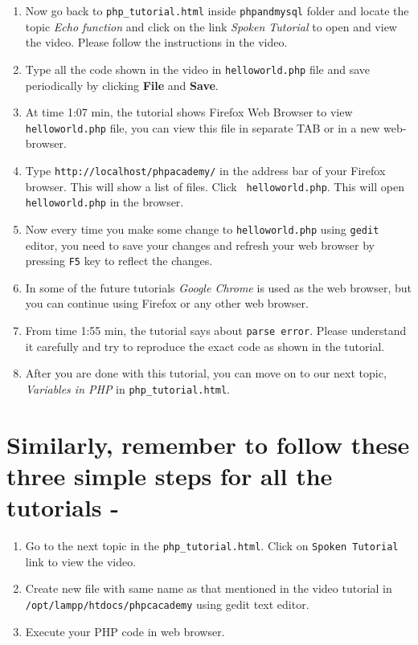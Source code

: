 \documentclass[11pt]{article}
\newenvironment{enumcpt}{\begin{enumerate} \topsep 0pt \partopsep 0pt 
    \parsep 0pt
    \itemsep 0pt \leftmargin -1in \rightmargin 0pt
}{\end{enumerate}}
\begin{document}
\begin{multicols}{2}
\begin{enumcpt}
\begin{enumcpt}
    \end{enumcpt}

  \item Now go back to {\tt php\_tutorial.html} inside {\tt phpandmysql}
    folder and locate the topic \emph{Echo function} and click on the
    link \emph{Spoken Tutorial} to open and view the video. Please
    follow the instructions in the video.
  \item Type all the code shown in the video in {\tt helloworld.php}
    file and save periodically by clicking \textbf{File} and
    \textbf{Save}.
  \item At time 1:07 min, the tutorial shows Firefox Web Browser to view
    {\tt helloworld.php} file, you can view this file in separate TAB or
    in a new web-browser.
  \item Type {\tt http://localhost/phpacademy/} in the address bar of
    your Firefox browser. This will show a list of files. Click {\tt
      helloworld.php}. This will open {\tt helloworld.php} in the
    browser.
  \item Now every time you make some change to {\tt helloworld.php}
    using {\tt gedit} editor, you need to save your changes and refresh
    your web browser by pressing {\tt F5} key to reflect the changes.
  \item In some of the future tutorials \emph{Google Chrome} is used as
    the web browser, but you can continue using Firefox or any other web
    browser.
  \item From time 1:55 min, the tutorial says about {\tt parse
    error}. Please understand it carefully and try to reproduce the
    exact code as shown in the tutorial.
  \item After you are done with this tutorial, you can move on to our
    next topic, \emph{Variables in PHP} in {\tt php\_tutorial.html}.
  \end{enumcpt}

  \section{Similarly, remember to follow these three simple steps for all the tutorials - }
  \begin{enumcpt}
  \item Go to the next topic in the {\tt php\_tutorial.html}. Click on {\tt Spoken Tutorial} link to view the video.
  \item Create new file with same name as that mentioned in the video tutorial in {\tt /opt/lampp/htdocs/phpcacademy} using gedit text editor.
  \item Execute your PHP code in web browser.
  \end{enumcpt}

\end{multicols}
\end{document}
